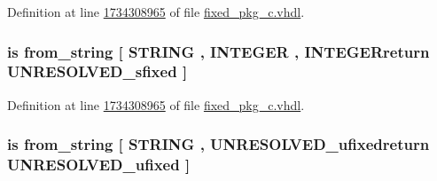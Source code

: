 Definition at line \hyperlink{fixed__pkg__c_8vhdl_source_l1734308965}{1734308965} of file \hyperlink{fixed__pkg__c_8vhdl_source}{fixed\+\_\+pkg\+\_\+c.\+vhdl}.

\hypertarget{classfixed__pkg_ae4aecc377c66b9a720d8f2f1387aedfc}{}
\subsubsection[{from\+\_\+binary\+\_\+string}]{ {\bfseries \textcolor{keywordflow}{is}\textcolor{vhdlchar}{ }\textcolor{vhdlchar}{from\+\_\+string}\textcolor{vhdlchar}{ }\textcolor{vhdlchar}{\mbox{[}}\textcolor{vhdlchar}{ }\textcolor{comment}{S\+T\+R\+I\+N\+G}\textcolor{vhdlchar}{ }\textcolor{vhdlchar}{,}\textcolor{vhdlchar}{ }\textcolor{comment}{I\+N\+T\+E\+G\+E\+R}\textcolor{vhdlchar}{ }\textcolor{vhdlchar}{,}\textcolor{vhdlchar}{ }\textcolor{vhdlchar}{I\+N\+T\+E\+G\+E\+Rreturn}\textcolor{vhdlchar}{ }{\bfseries {\bf U\+N\+R\+E\+S\+O\+L\+V\+E\+D\+\_\+sfixed}} \textcolor{vhdlchar}{ }\textcolor{vhdlchar}{\mbox{]}}\textcolor{vhdlchar}{ }} \hspace{0.3cm}{\ttfamily [Alias]}}\label{classfixed__pkg_ae4aecc377c66b9a720d8f2f1387aedfc}


Definition at line \hyperlink{fixed__pkg__c_8vhdl_source_l1734308965}{1734308965} of file \hyperlink{fixed__pkg__c_8vhdl_source}{fixed\+\_\+pkg\+\_\+c.\+vhdl}.

\hypertarget{classfixed__pkg_a75662d795197c31b5987068ea5454087}{}
\subsubsection[{from\+\_\+bstring}]{ {\bfseries \textcolor{keywordflow}{is}\textcolor{vhdlchar}{ }\textcolor{vhdlchar}{from\+\_\+string}\textcolor{vhdlchar}{ }\textcolor{vhdlchar}{\mbox{[}}\textcolor{vhdlchar}{ }\textcolor{comment}{S\+T\+R\+I\+N\+G}\textcolor{vhdlchar}{ }\textcolor{vhdlchar}{,}\textcolor{vhdlchar}{ }\textcolor{vhdlchar}{U\+N\+R\+E\+S\+O\+L\+V\+E\+D\+\_\+ufixedreturn}\textcolor{vhdlchar}{ }{\bfseries {\bf U\+N\+R\+E\+S\+O\+L\+V\+E\+D\+\_\+ufixed}} \textcolor{vhdlchar}{ }\textcolor{vhdlchar}{\mbox{]}}\textcolor{vhdlchar}{ }} \hspace{0.3cm}{\ttfamily [Alias]}}\label{classfixed__pkg_a75662d795197c31b5987068ea5454087}


